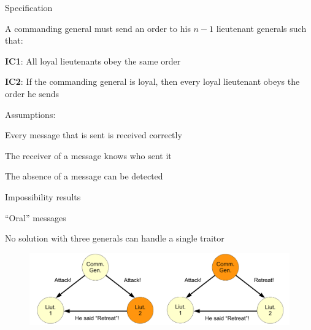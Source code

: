 \begin{frame}{Specification}

\BIL
\item A \alert{commanding general} must send an order to his $n-1$ \alert{lieutenant generals} such that:
\BI
\item \textbf{IC1}: All loyal lieutenants obey the same order
\item \textbf{IC2}: If the commanding general is loyal, then every loyal lieutenant obeys the order he sends
\EI
\item Assumptions:
\BI
\item Every message that is sent is received correctly
\item The receiver of a message knows who sent it
\item The absence of a message can be detected
\EI
\EIL

\end{frame}


\begin{frame}{Impossibility results}
	
\BI
\item “Oral” messages
\item No solution with three generals can handle a single traitor
\EI
	
\begin{figure}
	\includegraphics[width=\textwidth]{figs/14/impossibility}
\end{figure}

\end{frame}


